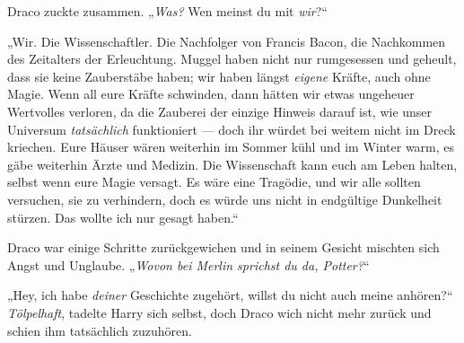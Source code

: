Draco zuckte zusammen.
„\emph{Was?} Wen meinst du mit \emph{wir}?“

„Wir. Die Wissenschaftler. Die Nachfolger von Francis Bacon, die Nachkommen des Zeitalters der Erleuchtung. Muggel haben nicht nur rumgesessen und geheult, dass sie keine Zauberstäbe haben; wir haben längst \emph{eigene} Kräfte, auch ohne Magie. Wenn all eure Kräfte schwinden, dann hätten wir etwas ungeheuer Wertvolles verloren, da die Zauberei der einzige Hinweis darauf ist, wie unser Universum \emph{tatsächlich} funktioniert — doch ihr würdet bei weitem nicht im Dreck kriechen. Eure Häuser wären weiterhin im Sommer kühl und im Winter warm, es gäbe weiterhin Ärzte und Medizin. Die Wissenschaft kann euch am Leben halten, selbst wenn eure Magie versagt. Es wäre eine Tragödie, und wir alle sollten versuchen, sie zu verhindern, doch es würde uns nicht in endgültige Dunkelheit stürzen. Das wollte ich nur gesagt haben.“

Draco war einige Schritte zurückgewichen und in seinem Gesicht mischten sich Angst und Unglaube.
„\emph{Wovon bei Merlin sprichst du da, Potter?}“

„Hey, ich habe \emph{deiner} Geschichte zugehört, willst du nicht auch meine anhören?“ \emph{Tölpelhaft}, tadelte Harry sich selbst, doch Draco wich nicht mehr zurück und schien ihm tatsächlich zuzuhören.

